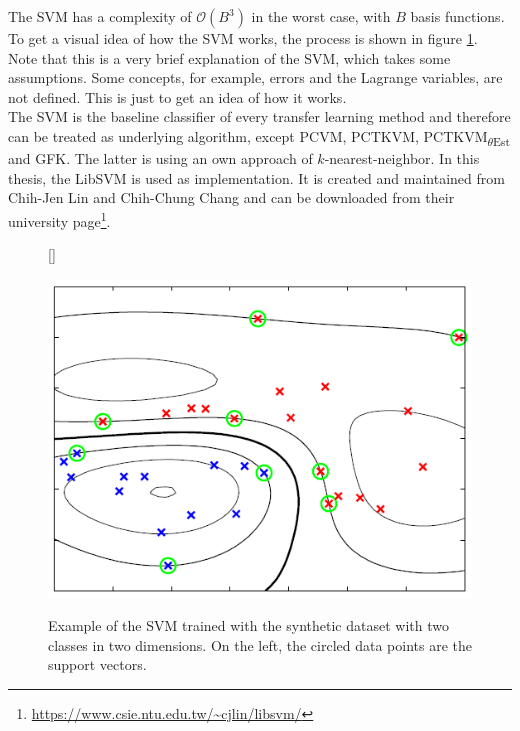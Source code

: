 The \ac{SVM} has a complexity of $\mathcal{O}(B^3)$ in the worst case, with $B$ basis functions.\cite[p. 329]{Bishop.2009}
To get a visual idea of how the \ac{SVM} works, the process is shown in figure \ref{FigSVMProd}.\\
Note that this is a very brief explanation of the \acs{SVM}, which takes some assumptions. 
Some concepts, for example, errors and the Lagrange variables, are not defined.
This is just to get an idea of how it works.\\
The \acs{SVM} is the baseline classifier of every transfer learning method and therefore can be treated as underlying algorithm, except \acs{PCVM}, \acs{PCTKVM}, \acs{PCTKVM}\textsubscript{$\theta$Est} and \acs{GFK}.
The latter is using an own approach of $k$-nearest-neighbor.
In this thesis, the LibSVM is used as implementation.
It is created and maintained from Chih-Jen Lin and Chih-Chung Chang and can be downloaded from their university page\footnote{\url{https://www.csie.ntu.edu.tw/~cjlin/libsvm/}}.
\begin{figure}
	\centering
	[\FBwidth]
	{\caption[Example of SVM Classification]{Example of the SVM trained with the synthetic dataset with two classes in two dimensions. On the left, the circled data points are the support vectors.\cite[p. 331]{Bishop.2009}}}
	{\includegraphics[width=\linewidth]{figures/SVMProd.png}\label{FigSVMProd}}
\end{figure}

